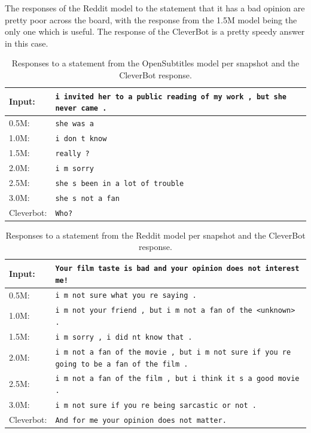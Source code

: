 The responses of the Reddit model to the statement that it has a bad opinion are pretty poor across the board, with the response from the 1.5M model being the only one which is useful. The response of the CleverBot is a pretty speedy answer in this case.
\\
\begin{table}[H]
	\centering
	\begin{adjustbox}{max width=\textwidth}
		\begin{tabular}{ll}
			\toprule
			Input: 	& \texttt{i invited her to a public reading of my work , but she never came .}\\
			\midrule
			0.5M: 	& \texttt{she was a}\\
			1.0M: 	& \texttt{i don t know}\\
			1.5M:	& \texttt{really ?}\\
			2.0M:	& \texttt{i m sorry}\\
			2.5M:	& \texttt{she s been in a lot of trouble}\\
			3.0M:	& \texttt{she s not a fan}\\
			Cleverbot:	& \texttt{Who?}\\
			\bottomrule
		\end{tabular}
	\end{adjustbox}
	\caption{Responses to a statement from the OpenSubtitles model per snapshot and the CleverBot response.}
	\label{results:example6_output:OpenSubtitle_compared}
\end{table}
\begin{table}[H]
	\centering
	\begin{adjustbox}{max width=\textwidth}
		\begin{tabular}{ll}
			\toprule
			Input: 	& \texttt{Your film taste is bad and your opinion does not interest me!}\\
			\midrule
			0.5M: 	& \texttt{i m not sure what you re saying .}\\
			1.0M: 	& \texttt{i m not your friend , but i m not a fan of the <unknown> .}\\
			1.5M:	& \texttt{i m sorry , i did nt know that .}\\
			2.0M:	& \texttt{i m not a fan of the movie , but i m not sure if you re going to be a fan of the film .}\\
			2.5M:	& \texttt{i m not a fan of the film , but i think it s a good movie .}\\
			3.0M:	& \texttt{i m not sure if you re being sarcastic or not .}\\
			Cleverbot:	& \texttt{And for me your opinion does not matter.}\\
			\bottomrule
		\end{tabular}
	\end{adjustbox}
	\caption{Responses to a statement from the Reddit model per snapshot and the CleverBot response.}
	\label{results:example6_output:Reddit_compared}
\end{table}

